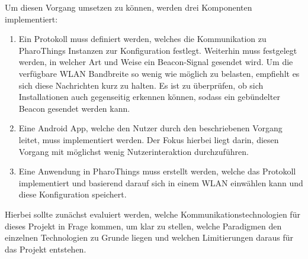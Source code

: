     Um diesen Vorgang umsetzen zu können, werden drei Komponenten implementiert:
    \begin{enumerate}
        \item Ein Protokoll muss definiert werden, welches die Kommunikation zu PharoThings Instanzen zur Konfiguration festlegt.
        Weiterhin muss festgelegt werden, in welcher Art und Weise ein Beacon-Signal gesendet wird.
        Um die verfügbare WLAN Bandbreite so wenig wie möglich zu belasten, empfiehlt es sich diese Nachrichten kurz zu halten. Es ist zu überprüfen,
        ob sich Installationen auch gegenseitig erkennen können, sodass ein gebündelter Beacon gesendet werden kann.
        \item Eine Android App, welche den Nutzer durch den beschriebenen Vorgang leitet, muss implementiert werden.
        Der Fokus hierbei liegt darin, diesen Vorgang mit möglichst wenig Nutzerinteraktion durchzuführen.
        \item Eine Anwendung in PharoThings muss erstellt werden, welche das Protokoll implementiert
        und basierend darauf sich in einem WLAN einwählen kann und diese Konfiguration speichert.
    \end{enumerate}
    Hierbei sollte zunächst evaluiert werden, welche Kommunikationstechnologien für dieses Projekt in Frage kommen, um klar zu stellen, welche Paradigmen den einzelnen Technologien zu Grunde liegen und welchen Limitierungen daraus für das Projekt entstehen.